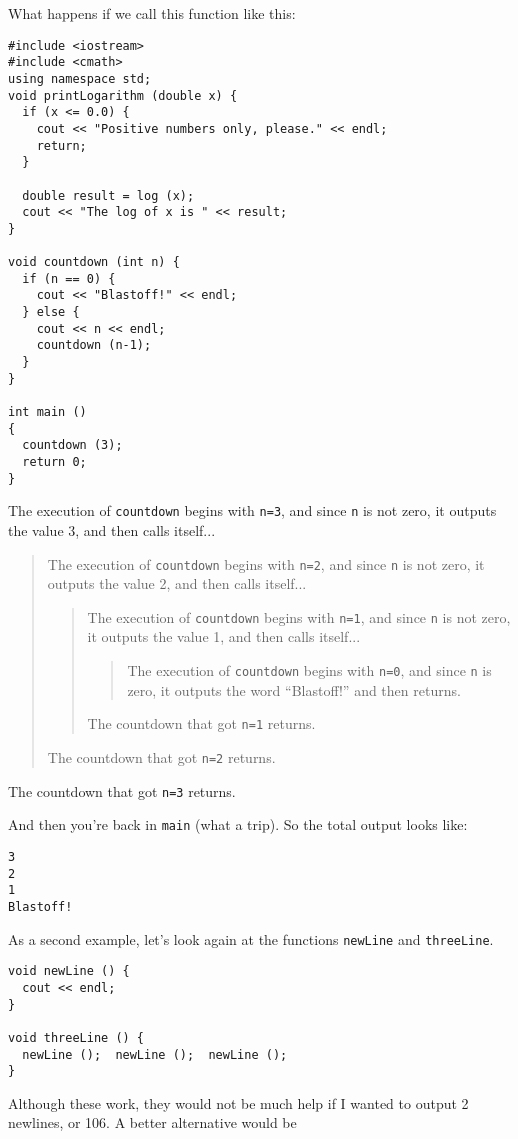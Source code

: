 What happens if we call this function like this:

\begin{verbatim}
#include <iostream>
#include <cmath>
using namespace std;
void printLogarithm (double x) {
  if (x <= 0.0) {
    cout << "Positive numbers only, please." << endl;
    return;
  }

  double result = log (x);
  cout << "The log of x is " << result;
}

void countdown (int n) {
  if (n == 0) {
    cout << "Blastoff!" << endl;
  } else {
    cout << n << endl;
    countdown (n-1);
  }
}

int main ()
{
  countdown (3);
  return 0;
}
\end{verbatim}
%
The execution of {\tt countdown} begins with {\tt n=3}, and
since {\tt n} is not zero, it outputs the value 3, and then
calls itself...

\begin{quote}
The execution of {\tt countdown} begins with {\tt n=2}, and
since {\tt n} is not zero, it outputs the value 2, and then
calls itself...

\begin{quote}
The execution of {\tt countdown} begins with {\tt n=1}, and
since {\tt n} is not zero, it outputs the value 1, and then
calls itself...

\begin{quote}
The execution of {\tt countdown} begins with {\tt n=0}, and
since {\tt n} is zero, it outputs the word ``Blastoff!''
and then returns.
\end{quote}

The countdown that got {\tt n=1} returns.

\end{quote}

The countdown that got {\tt n=2} returns.

\end{quote}

The countdown that got {\tt n=3} returns.

\noindent And then you're back in {\tt main} (what a trip).  So the
total output looks like:

\begin{verbatim}
3
2
1
Blastoff!
\end{verbatim}
%
As a second example, let's look again at the functions
{\tt newLine} and {\tt threeLine}.

\begin{verbatim}
void newLine () {
  cout << endl;
}

void threeLine () {
  newLine ();  newLine ();  newLine ();
}
\end{verbatim}
%
Although these work, they would not be much help if I wanted
to output 2 newlines, or 106.  A better alternative would be

